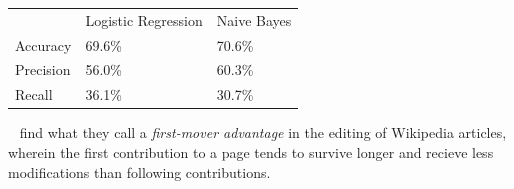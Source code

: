 \documentclass{iitthesis}
\begin{document}
\begin{table} \centering \label{tbl:classifiers}
  \begin{tabular}{lll}
  ~         & Logistic Regression & Naive Bayes \\
  Accuracy  & 69.6\%              & 70.6\%      \\
  Precision & 56.0\%              & 60.3\%      \\
  Recall    & 36.1\%              & 30.7\%      \\
  \end{tabular}
\end{table}



~\cite{viegas_studying_2004} find what they call a \textit{first-mover
advantage} in the editing of Wikipedia articles, wherein the first contribution
to a page tends to survive longer and recieve less modifications than following
contributions.


\clearpage


%
%

\appendix

%
%




\end{document}
